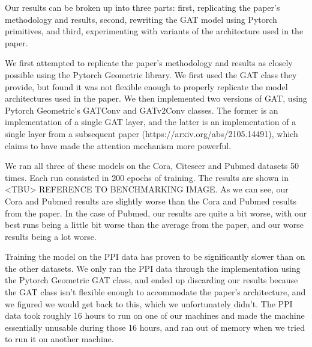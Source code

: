 Our results can be broken up into three parts: first, replicating the paper's
methodology and results, second, rewriting the GAT model using Pytorch
primitives, and third, experimenting with variants of the architecture used in
the paper.

We first attempted to replicate the paper's methodology and results as closely
possible using the Pytorch Geometric library. We first used the GAT class they
provide, but found it was not flexible enough to properly replicate the model
architectures used in the paper. We then implemented two versions of GAT, using
Pytorch Geometric's GATConv and GATv2Conv classes. The former is an
implementation of a single GAT layer, and the latter is an implementation of
a single layer from a subsequent paper (https://arxiv.org/abs/2105.14491),
which claims to have made the attention mechanism more powerful.

We ran all three of these models on the Cora, Citeseer and Pubmed datasets 50
times. Each run consisted in 200 epochs of training. The results are shown in
<TBU> REFERENCE TO BENCHMARKING IMAGE. As we can see, our Cora and Pubmed
results are slightly worse than the Cora and Pubmed results from the paper. In
the case of Pubmed, our results are quite a bit worse, with our best runs being
a little bit worse than the average from the paper, and our worse results being
a lot worse.

Training the model on the PPI data has proven to be significantly slower than
on the other datasets. We only ran the PPI data through the implementation
using the Pytorch Geometric GAT class, and ended up discarding our results
because the GAT class isn't flexible enough to accommodate the paper's
architecture, and we figured we would get back to this, which we unfortunately
didn't. The PPI data took roughly 16 hours to run on one of our machines and
made the machine essentially unusable during those 16 hours, and ran out of
memory when we tried to run it on another machine.

